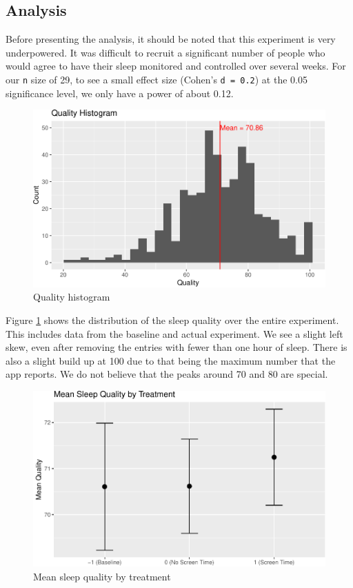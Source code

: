 \documentclass[12pt,]{article}
\begin{document}
\subsection{Analysis}\label{analysis}

Before presenting the analysis, it should be noted that this experiment
is very underpowered. It was difficult to recruit a significant number
of people who would agree to have their sleep monitored and controlled
over several weeks. For our \texttt{n} size of 29, to see a small effect
size (Cohen's \texttt{d\ =\ 0.2}) at the 0.05 significance level, we
only have a power of about 0.12.

\begin{figure}
\centering
\includegraphics{report_files/figure-latex/quality_histogram-1.pdf}
\caption{\label{fig:quality_histogram} Quality histogram}
\end{figure}

Figure \ref{fig:quality_histogram} shows the distribution of the sleep
quality over the entire experiment. This includes data from the baseline
and actual experiment. We see a slight left skew, even after removing
the entries with fewer than one hour of sleep. There is also a slight
build up at 100 due to that being the maximum number that the app
reports. We do not believe that the peaks around 70 and 80 are special.

\begin{figure}
\centering
\includegraphics{report_files/figure-latex/quality_by_treatment_fig-1.pdf}
\caption{\label{fig:quality_by_treatment_fig} Mean sleep quality by
treatment}
\end{figure}
\end{document}
